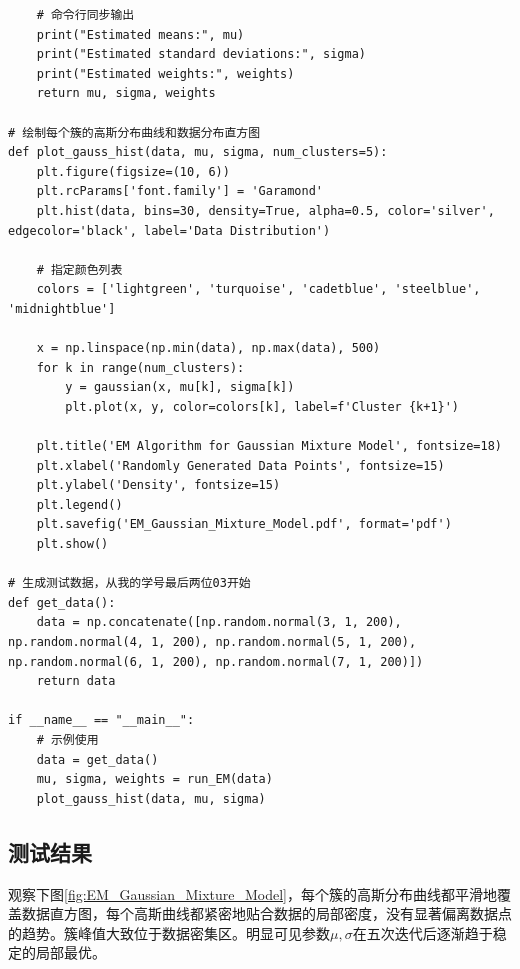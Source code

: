 \documentclass{article} %
\begin{document}
\begin{lstlisting}
    # 命令行同步输出
    print("Estimated means:", mu)
    print("Estimated standard deviations:", sigma)
    print("Estimated weights:", weights)
    return mu, sigma, weights

# 绘制每个簇的高斯分布曲线和数据分布直方图
def plot_gauss_hist(data, mu, sigma, num_clusters=5):
    plt.figure(figsize=(10, 6))
    plt.rcParams['font.family'] = 'Garamond'
    plt.hist(data, bins=30, density=True, alpha=0.5, color='silver', edgecolor='black', label='Data Distribution')

    # 指定颜色列表
    colors = ['lightgreen', 'turquoise', 'cadetblue', 'steelblue', 'midnightblue']

    x = np.linspace(np.min(data), np.max(data), 500)
    for k in range(num_clusters):
        y = gaussian(x, mu[k], sigma[k])
        plt.plot(x, y, color=colors[k], label=f'Cluster {k+1}')

    plt.title('EM Algorithm for Gaussian Mixture Model', fontsize=18)
    plt.xlabel('Randomly Generated Data Points', fontsize=15)
    plt.ylabel('Density', fontsize=15)
    plt.legend()
    plt.savefig('EM_Gaussian_Mixture_Model.pdf', format='pdf')
    plt.show()

# 生成测试数据，从我的学号最后两位03开始
def get_data():
    data = np.concatenate([np.random.normal(3, 1, 200), np.random.normal(4, 1, 200), np.random.normal(5, 1, 200), np.random.normal(6, 1, 200), np.random.normal(7, 1, 200)])
    return data

if __name__ == "__main__":
    # 示例使用
    data = get_data()
    mu, sigma, weights = run_EM(data)
    plot_gauss_hist(data, mu, sigma)
\end{lstlisting}

\subsection{测试结果}

观察下图\ref{fig:EM_Gaussian_Mixture_Model}，每个簇的高斯分布曲线都平滑地覆盖数据直方图，每个高斯曲线都紧密地贴合数据的局部密度，没有显著偏离数据点的趋势。簇峰值大致位于数据密集区。明显可见参数\(\mu,\sigma\)在五次迭代后逐渐趋于稳定的局部最优。
\end{document}
